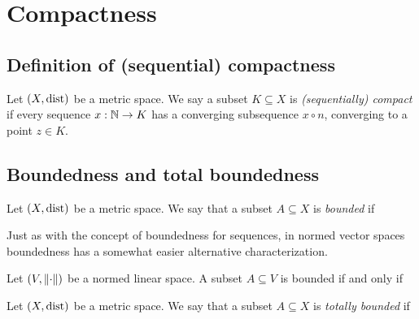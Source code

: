 \section{Compactness}

\subsection{Definition of (sequential) compactness}
\begin{definition}
    Let $(X, \text{dist})$ be a metric space. We say a subset $K \subseteq X$ is \emph{(sequentially) compact} if every sequence
    $x: \mathbb{N} \to K$ has a converging subsequence $x \circ n$, converging to a point $z \in K$.
\end{definition}

\subsection{Boundedness and total boundedness}
\begin{definition}
    Let $(X, \text{dist})$ be a metric space. We say that a subset $A \subseteq X$ is \emph{bounded} if
    \begin{myCenter}
    \end{myCenter}
\end{definition}

Just as with the concept of boundedness for sequences, in normed vector spaces boundedness has a somewhat easier alternative characterization.
\begin{proposition}
    Let $(V, \norm{\cdot})$ be a normed linear space. A subset $A \subseteq V$ is bounded if and only if
    \begin{myCenter}
    \end{myCenter}
\end{proposition}

\begin{definition}
    Let $(X, \text{dist})$ be a metric space. We say that a subset $A \subseteq X$ is \emph{totally bounded} if
    \begin{myCenter}
    \end{myCenter}
\end{definition}

